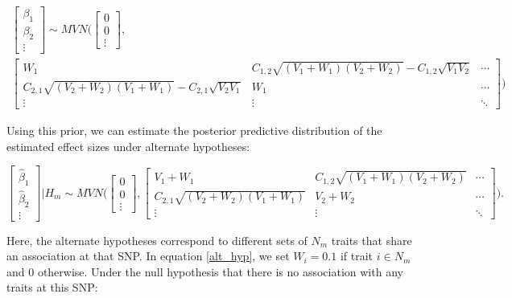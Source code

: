 \documentclass{article}
\begin{document}
\begin{multline}
\begin{bmatrix}
\beta_1 \\
\beta_2 \\
\vdots
\end{bmatrix}
\sim MVN \Bigg(
\begin{bmatrix}
0 \\
0 \\
\vdots
\end{bmatrix}, \\
\begin{bmatrix}
W_1 & C_{1,2} \sqrt{(V_1 + W_1)(V_2 + W_2)} - C_{1,2} \sqrt{V_1 V_2} & \cdots \\
C_{2,1} \sqrt{(V_2 + W_2) (V_1 + W_1)} - C_{2,1} \sqrt{V_2 V_1} & W_1 & \cdots \\
\vdots & \vdots & \ddots
\end{bmatrix}
\Bigg)
\end{multline}

\noindent Using this prior, we can estimate the posterior predictive distribution of the estimated effect sizes under alternate hypotheses:

\begin{equation}
\label{alt_hyp}
\begin{bmatrix}
\hat{\beta}_1 \\
\hat{\beta}_2 \\
\vdots
\end{bmatrix} | H_m
\sim MVN \Bigg(
\begin{bmatrix}
0 \\
0 \\
\vdots
\end{bmatrix},
\begin{bmatrix}
V_1 + W_1 & C_{1,2} \sqrt{(V_1 + W_1) (V_2 + W_2)} & \cdots \\
C_{2,1} \sqrt{(V_2 + W_2) (V_1 + W_1)} & V_2 + W_2 & \cdots \\
\vdots & \vdots & \ddots
\end{bmatrix}
\Bigg).
\end{equation}

\noindent Here, the alternate hypotheses correspond to different sets of $N_m$ traits that share an association at that SNP. In equation \ref{alt_hyp}, we set $W_i = 0.1$ if trait $i \in N_m$ and 0 otherwise. Under the null hypothesis that there is no association with any traits at this SNP:
\end{document}
